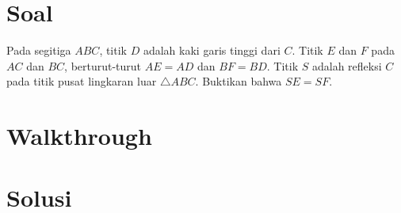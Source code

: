 \section{Soal}
Pada segitiga $ABC$, titik $D$ adalah kaki garis tinggi dari $C$. Titik $E$ dan $F$ pada $AC$ dan $BC$, berturut-turut $AE = AD$ dan $BF = BD$. Titik $S$ adalah refleksi $C$ pada titik pusat lingkaran luar $\triangle ABC$. Buktikan bahwa $SE=SF$.

\newpage
\section{Walkthrough}

\newpage
\section{Solusi}